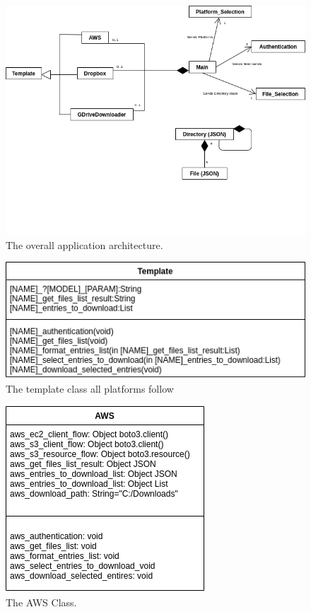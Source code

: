 \documentclass{article}
\begin{document}

\begin{figure}[H]
\includegraphics[scale=.25]{des_all}
\centering
\caption{The overall application architecture.}
\end{figure}

\begin{figure}[p]
\includegraphics[scale=.5]{des_template}
\centering
\caption{The template class all platforms follow}
\end{figure}

\begin{figure}[p]
\includegraphics[scale=.5]{des_aws}
\centering
\caption{The AWS Class.}
\end{figure}
\end{document}
